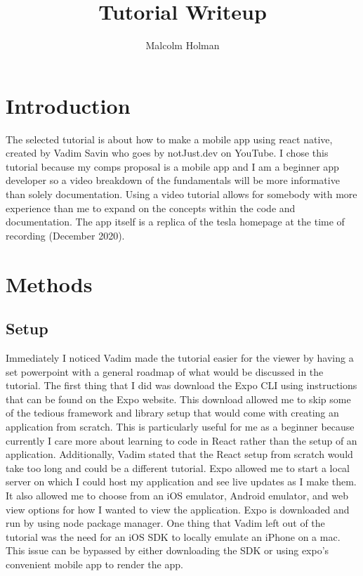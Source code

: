 \documentclass[10pt,twocolumn]{article}
\title{Tutorial Writeup}
\author{Malcolm Holman}
\affiliation{Occidental College}
\begin{document}
\maketitle

\section{Introduction}
    
    The selected tutorial is about how to make a mobile app using react native, created by Vadim Savin who goes by notJust.dev on YouTube. I chose this tutorial because my comps proposal is a mobile app and I am a beginner app developer so a video breakdown of the fundamentals will be more informative than solely documentation. Using a video tutorial allows for somebody with more experience than me to expand on the concepts within the code and documentation. The app itself is a replica of the tesla homepage at the time of recording (December 2020).
\section{Methods}
\subsection{Setup}

    Immediately I noticed Vadim made  the tutorial easier for the viewer by having a set powerpoint with a general roadmap of what would be discussed in the tutorial. The first thing that I did was download the Expo CLI using instructions that can be found on the Expo website. This download allowed me to skip some of the tedious framework and library setup that would come with creating an application from scratch. This is particularly useful for me as a beginner because currently I care more about learning to code in React rather than the setup of an application. Additionally, Vadim stated that the React setup from scratch would take too long and could be a different tutorial. Expo allowed me to start a local server on which I could host my application and see live updates as I make them. It also allowed me to choose from an iOS emulator, Android emulator, and web view options for how I wanted to view the application. Expo is downloaded and run by using node package manager. One thing that Vadim left out of the tutorial was the need for an iOS SDK to locally emulate an iPhone on a mac. This issue can be bypassed by either downloading the SDK or using expo’s convenient mobile app to render the app. 
    
\end{document}
